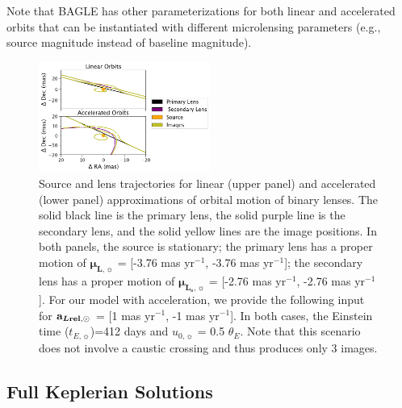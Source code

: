 \documentclass[twocolumn]{aastex701}
\newcommand{\vect}[1]{\boldsymbol{#1}}
\newcommand{\accLsec}{\bold{a}_{\boldsymbol{L\mathrm{rel}},\sun}}
\newcommand{\tE}{t_{E,\sun}}
\newcommand{\thetaE}{\theta_E}
\newcommand{\uo}{u_{0,\sun}}
\newcommand{\mulvec}{\vect{\mu}_{\boldsymbol{L},\sun}}
\newcommand{\mulsvec}{\vect{\mu}_{\boldsymbol{L_s} ,\sun}}
\begin{document}
Note that BAGLE has other parameterizations for both linear and accelerated orbits that can be instantiated with different microlensing parameters (e.g., source magnitude instead of baseline magnitude).





\begin{figure}
    \centering
    \includegraphics[width=0.5\textwidth]{figures/lin_lenses.png}
    \caption{Source and lens trajectories for linear (upper panel) and accelerated (lower panel) approximations of orbital motion of binary lenses. The solid black line is the primary lens, the solid purple line is the secondary lens, and the solid yellow lines are the image positions. In both panels, the source is stationary; the primary lens has a proper motion of $\mulvec$ = [-3.76 mas yr$^{-1}$, -3.76 mas yr$^{-1}$]; the secondary lens has a proper motion of  $\mulsvec$ = [-2.76 mas yr$^{-1}$, -2.76 mas yr$^{-1}$]. For our model with acceleration, we provide the following input for $\accLsec$ = [1 mas yr$^{-1}$, -1 mas yr$^{-1}$]. In both cases, the Einstein time ($\tE$)=412 days and $\uo$ = 0.5 $\thetaE$. Note that this scenario does not involve a caustic crossing and thus produces only 3 images.}
    \label{fig:psbl_linacc}
\end{figure}


\subsection{Full Keplerian Solutions}
\label{sec:binsources_kep}
\end{document}
